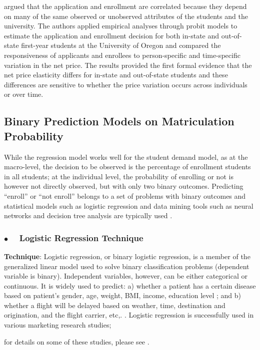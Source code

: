 \documentclass[12pt,english]{report}
\begin{document}
\citet{Curs2002} argued that the application and enrollment are correlated
because they depend on many of the same observed or unobserved attributes of
the students and the university.  The authors applied empirical analyses
through probit models to estimate the application and enrollment decision for
both in-state and out-of-state first-year students at the University of Oregon
and compared the responsiveness of applicants and enrollees to person-specific
and time-specific variation in the net price.   The results provided the first
formal evidence that the net price elasticity differs for in-state and
out-of-state students and these differences are sensitive to whether the price
variation occurs across individuals or over time.

\subsection{Binary Prediction Models on Matriculation Probability}
While the regression model works well for the student demand model, as at the
macro-level, the decision to be observed is the percentage of enrollment
students in all students;  at the individual level,  the probability of
enrolling or not is however not directly observed, but with only two binary
outcomes.  Predicting ``enroll'' or ``not enroll'' belongs to a set of 
problems with binary outcomes and statistical models such as logistic
regression and data mining tools such as neural networks and decision tree
analysis are typically used \citep{Han2011, James2014}.

\subsubsection{$\bullet \quad$  Logistic Regression Technique}
\textbf{Technique}: Logistic regression, or binary logistic regression, is a
member
of the generalized linear model used to solve binary classification problems
(dependent
variable is binary). Independent variables, however,  can be either categorical
or
continuous. It is widely used to predict: a) whether a patient has a certain 
disease based on patient's gender, age, weight, BMI, income, education level
\citep{Allenby1994};  and b) whether a flight will be delayed based on weather,
time, destination and origination, and the flight carrier, etc,.
\citep{Bhat1995}.
Logistic regression is successfully used in various marketing research studies;

for details on some of these studies, please see \citep{Hosmer2013}.
\end{document}
